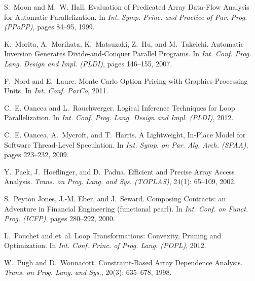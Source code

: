 \documentclass{sigplanconf}  %
\begin{document}
\begin{thebibliography}{49}
S.~Moon and M.~W. Hall.
\newblock Evaluation of {P}redicated {A}rray {D}ata-{F}low {A}nalysis for
  {A}utomatic {P}arallelization.
\newblock In \emph{Int. Symp. Princ. and Practice of Par. Prog. (PPoPP)}, pages
  84--95, 1999.

K.~Morita, A.~Morihata, K.~Matsuzaki, Z.~Hu, and M.~Takeichi.
\newblock Automatic {I}nversion {G}enerates {D}ivide-and-{C}onquer {P}arallel
  {P}rograms.
\newblock In \emph{Int. Conf. Prog. Lang. Design and Impl. (PLDI)}, pages
  146--155, 2007.

F.~Nord and E.~Laure.
\newblock Monte {C}arlo {O}ption {P}ricing with {G}raphics {P}rocessing
  {U}nits.
\newblock In \emph{Int. Conf. ParCo}, 2011.

C.~E. Oancea and L.~Rauchwerger.
\newblock Logical {I}nference {T}echniques for {L}oop {P}arallelization.
\newblock In \emph{Int. Conf. Prog. Lang. Design and Impl. (PLDI)}, 2012.

C.~E. Oancea, A.~Mycroft, and T.~Harris.
\newblock A {L}ightweight, {I}n-{P}lace {M}odel for {S}oftware {T}hread-{L}evel
  {S}peculation.
\newblock In \emph{Int. Symp. on Par. Alg. Arch. (SPAA)}, pages 223--232, 2009.

Y.~Paek, J.~Hoeflinger, and D.~Padua.
\newblock Efficient and {P}recise {A}rray {A}ccess {A}nalysis.
\newblock \emph{Trans. on Prog. Lang. and Sys. (TOPLAS)}, 24(1):
  65--109, 2002.

S.~{Peyton Jones}, J.-M. Eber, and J.~Seward.
\newblock Composing {C}ontracts: an {A}dventure in {F}inancial {E}ngineering
  (functional pearl).
\newblock In \emph{Int. Conf. on Funct. Prog. (ICFP)}, pages 280--292, 2000.

L.~Pouchet and et~al.
\newblock Loop {T}ransformations: {C}onvexity, {P}runing and {O}ptimization.
\newblock In \emph{Int. Conf. Princ. of Prog. Lang. (POPL)}, 2012.

W.~Pugh and D.~Wonnacott.
\newblock Constraint-{B}ased {A}rray {D}ependence {A}nalysis.
\newblock \emph{Trans. on Prog. Lang. and Sys.}, 20(3): 635--678,
  1998.


\end{thebibliography}
\end{document}
